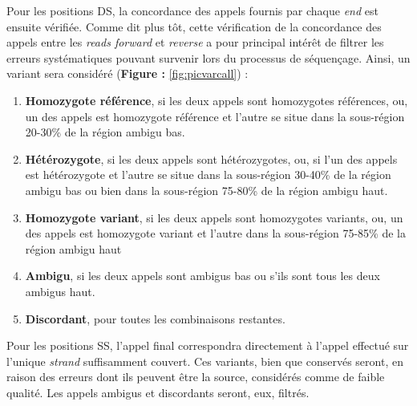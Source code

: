\documentclass[12pt,a4paper,twoside]{ugathesis}
\theoremstyle{definition}
\theoremstyle{definition}
\theoremstyle{definition}
\theoremstyle{remark}
\begin{document}
Pour les positions DS, la concordance des appels fournis par chaque
\emph{end} est ensuite vérifiée. Comme dit plus tôt, cette vérification
de la concordance des appels entre les \emph{reads forward} et
\emph{reverse} a pour principal intérêt de filtrer les erreurs
systématiques pouvant survenir lors du processus de séquençage. Ainsi,
un variant sera considéré (\textbf{Figure : }\ref{fig:picvarcall}) :

\begin{enumerate}
\def\labelenumi{\arabic{enumi}.}
\item
  \textbf{Homozygote référence}, si les deux appels sont homozygotes
  références, ou, un des appels est homozygote référence et l'autre se
  situe dans la sous-région 20-30\% de la région ambigu bas.
\item
  \textbf{Hétérozygote}, si les deux appels sont hétérozygotes, ou, si
  l'un des appels est hétérozygote et l'autre se situe dans la
  sous-région 30-40\% de la région ambigu bas ou bien dans la
  sous-région 75-80\% de la région ambigu haut.
\item
  \textbf{Homozygote variant}, si les deux appels sont homozygotes
  variants, ou, un des appels est homozygote variant et l'autre dans la
  sous-région 75-85\% de la région ambigu haut
\item
  \textbf{Ambigu}, si les deux appels sont ambigus bas ou s'ils sont
  tous les deux ambigus haut.
\item
  \textbf{Discordant}, pour toutes les combinaisons restantes.
\end{enumerate}

Pour les positions SS, l'appel final correspondra directement à l'appel
effectué sur l'unique \emph{strand} suffisamment couvert. Ces variants,
bien que conservés seront, en raison des erreurs dont ils peuvent être
la source, considérés comme de faible qualité. Les appels ambigus et
discordants seront, eux, filtrés.

\newpage
\end{document}
